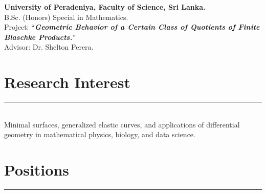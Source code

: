 \documentclass[12pt]{book}
\begin{document}
\noindent \textbf{University of Peradeniya, Faculty of Science, Sri Lanka.}\\
B.Sc. (Honors) Special in Mathematics. \\
Project: ``\textit{\textbf{Geometric Behavior of a Certain Class of Quotients of Finite Blaschke Products.}}''\\
Advisor: Dr. Shelton Perera. \\

\section*{Research Interest} \rule{\textwidth}{1pt}\\

Minimal surfaces, generalized elastic curves, and applications of differential geometry in mathematical physics, biology, and data science.\\


\section*{Positions}  \rule{\textwidth}{1pt}\\
\end{document}
